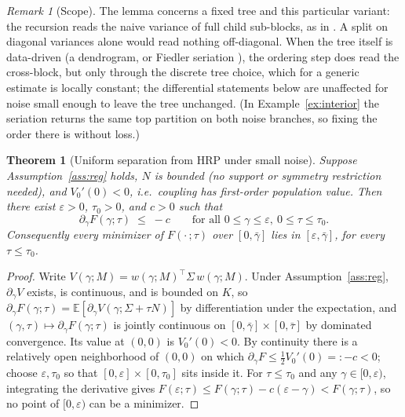 \documentclass[11pt]{article}
\newtheorem{theorem}{Theorem}
\theoremstyle{remark}
\newtheorem{remark}{Remark}
\newcommand{\E}{\mathbb{E}}
\begin{document}
\begin{remark}[Scope]
\label{rem:scope}
The lemma concerns a fixed tree and this particular variant: the recursion
reads the naive variance of full child sub-blocks, as in
\cite{lopezdeprado2016}. A split on diagonal variances alone would read
nothing off-diagonal. When the tree itself is data-driven (a dendrogram, or
Fiedler seriation \cite{cotton2024schur}), the ordering step does read the
cross-block, but only through the discrete tree choice, which for a generic
estimate is locally constant; the differential statements below are
unaffected for noise small enough to leave the tree unchanged. (In
Example~\ref{ex:interior} the seriation returns the same top partition on
both noise branches, so fixing the order there is without loss.)
\end{remark}

\begin{theorem}[Uniform separation from HRP under small noise]
\label{thm:nohrp}
Suppose Assumption~\ref{ass:reg} holds, $N$ is bounded (no support or
symmetry restriction needed), and $V_0'(0) < 0$, i.e.\ coupling has
first-order population value. Then there exist $\varepsilon > 0$,
$\tau_0 > 0$, and $c > 0$ such that
\[
  \partial_\gamma F(\gamma; \tau) \;\le\; -c
  \qquad\text{for all } 0 \le \gamma \le \varepsilon,\ 0 \le \tau \le \tau_0.
\]
Consequently every minimizer of $F(\cdot\,;\tau)$ over $[0,\bar\gamma]$ lies
in $[\varepsilon, \bar\gamma]$, for every $\tau \le \tau_0$.
\end{theorem}
\begin{proof}
Write $V(\gamma; M) = w(\gamma; M)^\top \Sigma\, w(\gamma; M)$. Under
Assumption~\ref{ass:reg}, $\partial_\gamma V$ exists, is continuous, and is
bounded on $K$, so
$\partial_\gamma F(\gamma;\tau) = \E[\partial_\gamma V(\gamma; \Sigma +
\tau N)]$ by differentiation under the expectation, and
$(\gamma, \tau) \mapsto \partial_\gamma F(\gamma;\tau)$ is jointly
continuous on $[0,\bar\gamma] \times [0,\bar\tau]$ by dominated convergence.
Its value at $(0, 0)$ is $V_0'(0) < 0$. By continuity there is a relatively
open neighborhood of $(0,0)$ on which
$\partial_\gamma F \le \tfrac12 V_0'(0) =: -c < 0$; choose
$\varepsilon, \tau_0$ so that
$[0,\varepsilon] \times [0,\tau_0]$ sits inside it. For $\tau \le \tau_0$
and any $\gamma \in [0, \varepsilon)$, integrating the derivative gives
$F(\varepsilon;\tau) \le F(\gamma;\tau) - c(\varepsilon - \gamma) <
F(\gamma;\tau)$, so no point of $[0, \varepsilon)$ can be a minimizer.
\end{proof}
\end{document}
